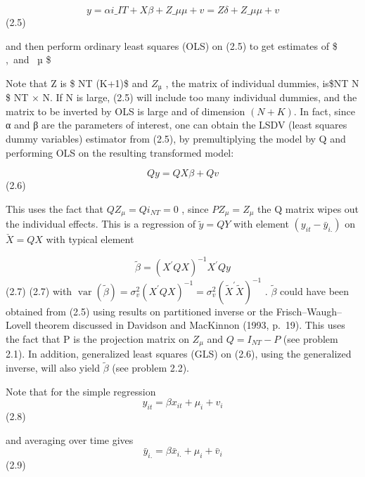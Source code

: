 \documentclass[
]{book}
\begin{document}
\begin{equation} 
y=\alpha i\_{IT} + X\beta + Z\_\mu \mu +v = Z\delta + Z\_\mu \mu +v 
\end{equation} (2.5)

and then perform ordinary least squares (OLS) on (2.5) to get estimates of \$ \alpha,\beta ~and ~µ \$

Note that Z is \$ NT \times (K+1)\$ and \(Z_µ\) , the matrix of individual dummies, is\$NT \times N \$ NT × N. If N is large, (2.5) will include too many individual dummies, and the matrix to be inverted by OLS is large and of dimension \((N + K)\). In fact, since α and β are the parameters of interest, one can obtain the LSDV (least squares dummy variables) estimator from (2.5), by premultiplying the model by Q and performing OLS on the resulting transformed model:

\begin{equation} Qy=QX\beta + Qv\end{equation} (2.6)

This uses the fact that \(QZ_\mu =Qi_{NT}=0\) , since \(PZ_\mu =Z_\mu\) the Q matrix wipes out the individual effects. This is a regression of \(\tilde y =QY\) with element \((y_{it} - \bar y _{i.} )\) on \(\check X=QX\) with typical element

\begin{equation}
\widetilde{\beta}=\left(X^{\prime} Q X\right)^{-1} X^{\prime} Q y
\end{equation} (2.7)
(2.7) with \(\operatorname{var}(\widetilde{\beta})=\sigma_{v}^{2}\left(X^{\prime} Q X\right)^{-1}=\sigma_{v}^{2}\left(\widetilde{X}^{\prime} \tilde{X}\right)^{-1}\) . \(\widetilde{\beta}\) could have been obtained from (2.5) using results on partitioned inverse or the Frisch--Waugh--Lovell theorem discussed in Davidson and MacKinnon (1993, p.~19). This uses the fact that P is the projection matrix on \(Z_{\mu}\) and \(Q = I_{NT} − P\) (see problem 2.1). In addition, generalized least squares (GLS) on (2.6), using the generalized inverse, will also yield \(\widetilde{\beta }\) (see problem 2.2).

Note that for the simple regression
\begin{equation}y_{it}=\beta x_{it}+ \mu_i+ v_i     \end{equation} (2.8)

and averaging over time gives
\begin{equation}  \bar {y}_{i.}= \beta \bar{x}_{i.}+ \mu_i+ \bar{v}_i   \end{equation} (2.9)
\end{document}
